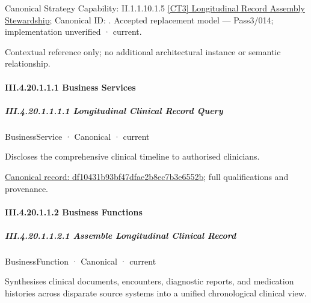{\small Canonical Strategy Capability: II.1.1.10.1.5 \hyperref[element:4507ca47f4bd40c085e069ac6e42888b]{[CT3] Longitudinal Record Assembly Stewardship}; Canonical ID: \texttt{}. Accepted replacement model — Pass3/014; implementation unverified · current.}\par
Contextual reference only; no additional architectural instance or semantic relationship.\par
\paragraph*{III.4.20.1.1.1 Business Services}
\label{navigation:III.4.20.1.1.1}

\subparagraph*{III.4.20.1.1.1.1 Longitudinal Clinical Record Query}
\label{navigation:III.4.20.1.1.1.1}

\label{element:df10431b93bf47dfae2b8ec7b3e6552b}
{\small BusinessService · Canonical · current}\par

Discloses the comprehensive clinical timeline to authorised clinicians.


{\footnotesize \href{../../../../continuum/business/business-service/df10431b93bf47dfae2b8ec7b3e6552b.md}{Canonical record: df10431b93bf47dfae2b8ec7b3e6552b}; full qualifications and provenance.}\par
\paragraph*{III.4.20.1.1.2 Business Functions}
\label{navigation:III.4.20.1.1.2}

\subparagraph*{III.4.20.1.1.2.1 Assemble Longitudinal Clinical Record}
\label{navigation:III.4.20.1.1.2.1}

\label{element:65ea2d2427dd474d84f153671de79d63}
{\small BusinessFunction · Canonical · current}\par

Synthesises clinical documents, encounters, diagnostic reports, and medication histories across disparate source systems into a unified chronological clinical view.


